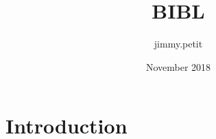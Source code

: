 \documentclass{article}
\title{BIBL}
\author{jimmy.petit }
\date{November 2018}
\begin{document}
\maketitle

\section{Introduction}
\end{document}

